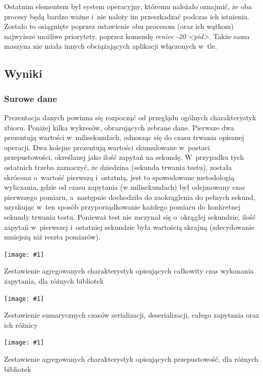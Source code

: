 \documentclass[12pt]{article}
\newcommand{\putfig}[3]{
\begin{captioned}[H]
	\centering
	\texttt{[image: \#1]}
	\caption{#2}
	\label{#3}
	\medskip
\end{captioned}
}
\newcommand{\code}[1]{{\it #1}}
\begin{document}
{{{				Ostatnim elementem był system operacyjny, któremu należało oznajmić, że oba procesy będą bardzo ważne i~nie należy im przeszkadzać podczas ich istnienia. Zostało to
				osiągnięte poprzez ustawienie obu procesom (oraz ich wątkom) najwyższe możliwe priorytety, poprzez komendę \code{renice -20 <pid>}.
				Także sama maszyna nie miała innych obciążających aplikacji włączonych w~tle.
			}
		}

		{
			\subsection{Wyniki}

			{
				\subsubsection{Surowe dane}

				Prezentacja danych powinna się rozpocząć od przeglądu ogólnych charakterystyk zbioru. Poniżej kilka wykresów, obrazujących zebrane dane.
				Pierwsze dwa prezentują wartości w~milisekundach, odnosząc się do czasu trwania opisanej operacji. Dwa kolejne prezentują wartości skumulowane
				w~postaci przepustowości, określanej jako ilość zapytań na sekundę. W~przypadku tych ostatnich trzeba zaznaczyć, że dziedzina (sekunda trwania testu),
				została skrócona o~wartość pierwszą i~ostatnią, jest to spowodowane metodologią wyliczania, gdzie od czasu zapytania (w milisekundach) był odejmowany
				czas pierwszego pomiaru, a~następnie dochodziło do zaokrąglenia do pełnych sekund, uzyskując w~ten sposób przyporządkowanie każdego pomiaru do konkretnej sekundy trwania testu.
				Ponieważ test nie zaczynał się o~okrągłej sekundzie, ilość zapytań w~pierwszej i~ostatniej sekundzie była wartością skrajną (zdecydowanie mniejszą niż reszta pomiarów).

				{
					\putfig{./charts/pre_generated_charts/total_request_time_per_library_summary.png}{
						Zestawienie agregowanych charakterystyk opisujących całkowity czas wykonania zapytania, dla różnych bibliotek
					}{sumfig_1}
				}

				{
					\putfig{./charts/pre_generated_charts/total_serial_and_deserial_library_summmary.png}{
						Zestawienie sumarycznych czasów serializacji, deserializacji, całego zapytania oraz ich różnicy
					}{sumfig_2}
				}

				{
					\putfig{./charts/pre_generated_charts/throughput_summary_per_library_summary.png}{
						Zestawienie agregowanych charakterystyk opisujących przepustowość, dla różnych bibliotek
					}{sumfig_3}
				}

}}}
\end{document}
